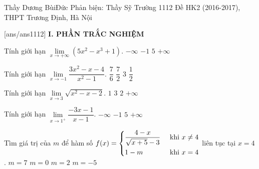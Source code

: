 \begin{name}
{Thầy Dương BùiĐức \newline Phản biện: Thầy Sỹ Trường}
		{1112 Đề HK2 (2016-2017), THPT Trương Định, Hà Nội}
	\end{name}
\setcounter{ex}{0}\setcounter{bt}{0}
[ans/ans1112]
\noindent\textbf{I. PHẦN TRẮC NGHIỆM}
\begin{ex}%
Tính giới hạn $\lim\limits_{x\to+\infty}(5x^{2}-x^{3}+1)$.
\choice
{\True $-\infty$}
{$-1$}
{$5$}
{$+\infty$}
\end{ex}
\begin{ex}%
Tính giới hạn $\lim\limits_{x\to-1}\dfrac{3x^{2}-x-4}{x^{2}-1}$.
\choice
{$\dfrac{7}{6}$}
{\True $\dfrac{7}{2}$}
{$3$}
{$\dfrac{1}{2}$}
\end{ex}
\begin{ex}%
Tính giới hạn $\lim\limits_{x\to 3}\sqrt{x^{2}-x-2}$.
\choice
{$1$}
{$3$}
{\True $2$}
{$+\infty$}
\end{ex}
\begin{ex}%
Tính giới hạn $\lim\limits_{x\to 1^{+}}\dfrac{-3x-1}{x-1}$.
\choice
{\True $-\infty$}
{$-1$}
{$5$}
{$+\infty$}
\end{ex}
\begin{ex}%
Tìm giá trị của $m$ để hàm số $f(x)=\left\{\begin{aligned}&\dfrac{4-x}{\sqrt{x+5}-3}&\mbox{ khi }x\neq 4\\ &1-m&\mbox{ khi }x=4\end{aligned}\right.$ liên tục tại $x=4$.
\choice
{\True $m=7$}
{$m=0$}
{$m=2$}
{$m=-5$}
\end{ex}
